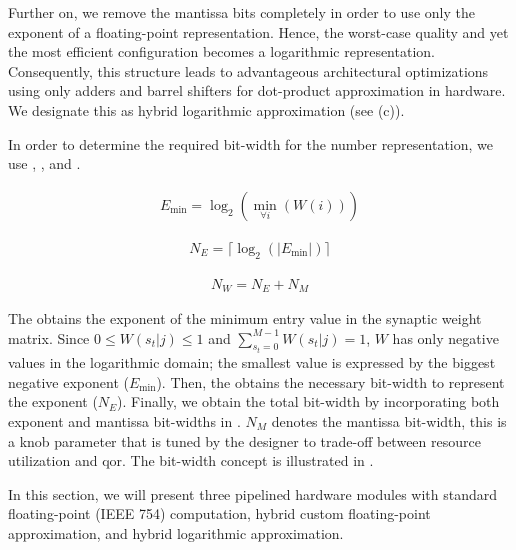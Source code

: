 Further on, we remove the mantissa bits completely in order to use only the exponent of a floating-point representation. Hence, the worst-case quality and yet the most efficient configuration becomes a logarithmic representation. Consequently, this structure leads to advantageous architectural optimizations using only adders and barrel shifters for dot-product approximation in hardware. We designate this as hybrid logarithmic approximation (see {}(c)).

In order to determine the required bit-width for the number representation, we use {}, {}, and {}.

\begin{eqnarray} \label{eq:exp_max}
E_{\min}=\log _2(\min_{\forall i}(W(i)))
\end{eqnarray}

\begin{eqnarray} \label{eq:bits_exp}
N_E=\lceil\log_2(|E_{\min}|)\rceil
\end{eqnarray}

\begin{eqnarray} \label{eq:bits_bitwidth}
N_W=N_E + N_M
\end{eqnarray}


The  obtains the exponent of the minimum entry value in the synaptic weight matrix. Since $0\le W(s_t|j)\le1$ and $\sum_{s_t=0}^{M-1}W(s_t|j)=1$, $W$ has only negative values in the logarithmic domain; the smallest value is expressed by the biggest negative exponent ($E_{\min}$). Then, the {} obtains the necessary bit-width to represent the exponent ($N_E$). Finally, we obtain the total bit-width by incorporating both exponent and mantissa bit-widths in {}. $N_M$ denotes the mantissa bit-width, this is a knob parameter that is tuned by the designer to trade-off between resource utilization and \gls{qor}. The bit-width concept is illustrated in {}.

In this section, we will present three pipelined hardware modules with standard floating-point (IEEE 754) computation, hybrid custom floating-point approximation, and hybrid logarithmic approximation.

